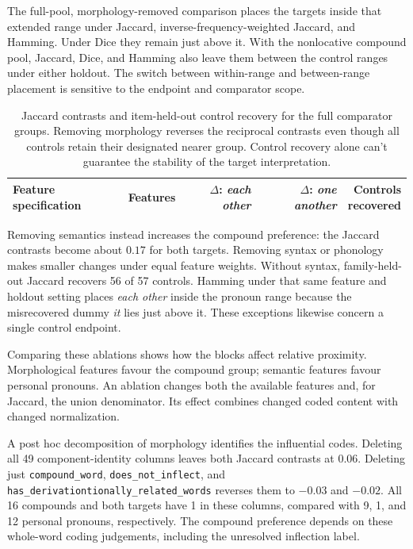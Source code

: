 \documentclass[12pt]{article}
\providecommand{\mention}[1]{\textit{#1}}
\begin{document}
The full-pool, morphology-removed comparison places the targets inside that extended range under Jaccard, inverse-frequency-weighted Jaccard, and Hamming. Under Dice they remain just above it. With the nonlocative compound pool, Jaccard, Dice, and Hamming also leave them between the control ranges under either holdout. The switch between within-range and between-range placement is sensitive to the endpoint and comparator scope.

\begin{table}[htbp]
\centering\small
\begin{tabular}{lrrrr}
\toprule
Feature specification & Features & \shortstack{$\Delta$:\\\mention{each other}} & \shortstack{$\Delta$:\\\mention{one another}} & \shortstack{Controls\\recovered} \\
\midrule

\end{tabular}
\caption{Jaccard contrasts and item-held-out control recovery for the full comparator groups. Removing morphology reverses the reciprocal contrasts even though all controls retain their designated nearer group. Control recovery alone can't guarantee the stability of the target interpretation.}
\label{tab:ablations}
\end{table}

Removing semantics instead increases the compound preference: the Jaccard contrasts become about $0.17$ for both targets. Removing syntax or phonology makes smaller changes under equal feature weights. Without syntax, family-held-out Jaccard recovers 56 of 57 controls. Hamming under that same feature and holdout setting places \mention{each other} inside the pronoun range because the misrecovered dummy \mention{it} lies just above it. These exceptions likewise concern a single control endpoint.

Comparing these ablations shows how the blocks affect relative proximity. Morphological features favour the compound group; semantic features favour personal pronouns. An ablation changes both the available features and, for Jaccard, the union denominator. Its effect combines changed coded content with changed normalization.

A post hoc decomposition of morphology identifies the influential codes. Deleting all 49 component-identity columns leaves both Jaccard contrasts at $0.06$. Deleting just \texttt{compound\_word}, \texttt{does\_not\_inflect}, and \texttt{has\_\allowbreak derivationtionally\_\allowbreak related\_\allowbreak words} reverses them to $-0.03$ and $-0.02$. All 16 compounds and both targets have 1 in these columns, compared with 9, 1, and 12 personal pronouns, respectively. The compound preference depends on these whole-word coding judgements, including the unresolved inflection label.
\end{document}
